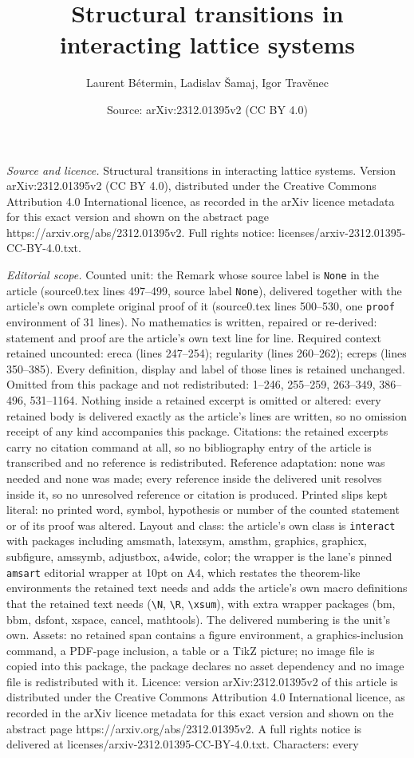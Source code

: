 \documentclass[10pt,a4paper]{amsart}
\title[Structural transitions in interacting lattice systems]{Structural transitions in interacting lattice systems}
\author{Laurent B\'etermin, Ladislav \v{S}amaj, Igor Trav\v{e}nec}
\date{Source: arXiv:2312.01395v2 (CC BY 4.0)}
\begin{document}
\maketitle

\noindent\emph{Source and licence.} Structural transitions in interacting lattice systems. Version arXiv:2312.01395v2 (CC BY 4.0), distributed under the Creative Commons Attribution 4.0 International licence, as recorded in the arXiv licence metadata for this exact version and shown on the abstract page https://arxiv.org/abs/2312.01395v2. Full rights notice: licenses/arxiv-2312.01395-CC-BY-4.0.txt.\par\smallskip

\noindent\textit{Editorial scope.} Counted unit: the Remark whose source label is \texttt{None} in the article (source0.tex lines 497--499, source label \texttt{None}), delivered together with the article's own complete original proof of it (source0.tex lines 500--530, one \texttt{proof} environment of 31 lines). No mathematics is written, repaired or re-derived: statement and proof are the article's own text line for line. Required context retained uncounted: ereca (lines 247--254); regularity (lines 260--262); ecreps (lines 350--385). Every definition, display and label of those lines is retained unchanged. Omitted from this package and not redistributed: 1--246, 255--259, 263--349, 386--496, 531--1164. Nothing inside a retained excerpt is omitted or altered: every retained body is delivered exactly as the article's lines are written, so no omission receipt of any kind accompanies this package. Citations: the retained excerpts carry no citation command at all, so no bibliography entry of the article is transcribed and no reference is redistributed. Reference adaptation: none was needed and none was made; every reference inside the delivered unit resolves inside it, so no unresolved reference or citation is produced. Printed slips kept literal: no printed word, symbol, hypothesis or number of the counted statement or of its proof was altered. Layout and class: the article's own class is \texttt{interact} with packages including amsmath, latexsym, amsthm, graphics, graphicx, subfigure, amssymb, adjustbox, a4wide, color; the wrapper is the lane's pinned \texttt{amsart} editorial wrapper at 10pt on A4, which restates the theorem-like environments the retained text needs and adds the article's own macro definitions that the retained text needs (\texttt{\textbackslash N}, \texttt{\textbackslash R}, \texttt{\textbackslash xsum}), with extra wrapper packages (bm, bbm, dsfont, xspace, cancel, mathtools). The delivered numbering is the unit's own. Assets: no retained span contains a figure environment, a graphics-inclusion command, a PDF-page inclusion, a table or a TikZ picture; no image file is copied into this package, the package declares no asset dependency and no image file is redistributed with it. Licence: version arXiv:2312.01395v2 of this article is distributed under the Creative Commons Attribution 4.0 International licence, as recorded in the arXiv licence metadata for this exact version and shown on the abstract page https://arxiv.org/abs/2312.01395v2. A full rights notice is delivered at licenses/arxiv-2312.01395-CC-BY-4.0.txt. Characters: every 
\end{document}
